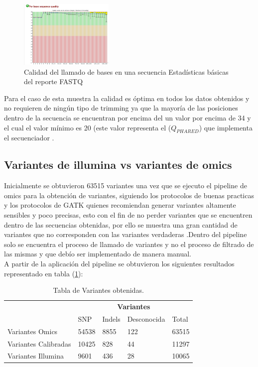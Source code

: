 \begin{figure}[H]
	\centering
	\includegraphics[width=0.4\textwidth]{Kap2/fastq2}
	\caption{Calidad del llamado de bases en una secuencia Estadísticas básicas del reporte FASTQ} \label{fig:fastq2}
\end{figure}

Para el caso de esta muestra la calidad es óptima en todos los datos obtenidos y no requieren de ningún tipo de trimming ya que la mayoría de las posiciones dentro de la secuencia se encuentran por encima del un valor por encima de 34 y el cual el valor mínimo es 20 (este valor representa el ($Q_{PHARED}$) que implementa el secuenciador \cite{Babraham2016}. \\ 

\subsection*{Variantes de illumina vs variantes de omics}

Inicialmente se obtuvieron 63515 variantes una vez que se ejecuto el pipeline de omics para la obtención de variantes, siguiendo los protocolos de buenas practicas y los protocolos de GATK quienes recomiendan generar variantes altamente sensibles y poco precisas, esto con el fin de no perder variantes que se encuentren dentro de las secuencias obtenidas, por ello se muestra una gran cantidad de variantes que no corresponden con las variantes verdaderas \cite{Auwera2014}.Dentro del pipeline solo se encuentra el proceso de llamado de variantes y no el proceso de filtrado de las mismas y que debío ser implementado de manera manual.\\

A partir de la aplicación del pipeline se obtuvieron los siguientes resultados representado en tabla (\ref{tabla:final}):

\begin{table}[htb]
	\centering
	\begin{tabular}{|l|l|l|l|l|}
		\hline
		& \multicolumn{4}{c|}{\textbf{Variantes}} \\
		\cline{2-5} 
		& SNP  & Indels & Desconocida & Total \\ \cline{2-5}
		\hline 
		\multirow{1}{4cm}{Variantes Omics} & 54538 & 8855 & 122 & 63515 \\ \cline{2-5}
		\hline 
		\multirow{1}{4cm}{Variantes Calibradas} & 10425 & 828 & 44 & 11297 \\ \cline{2-5}
		\hline
		\multirow{1}{4cm}{Variantes Illumina} & 9601 & 436 & 28 & 10065 \\ \cline{2-5}
		\hline
	\end{tabular}
	\caption{Tabla de Variantes obtenidas.}
	\label{tabla:final}
\end{table}

